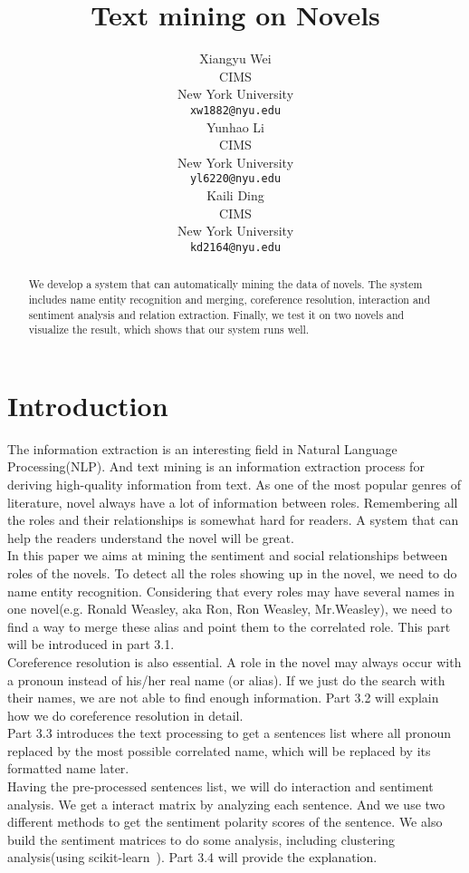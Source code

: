 \documentclass[11pt]{article}
\title{Text mining on Novels}
\author{Xiangyu Wei \\
  CIMS \\
  New York University \\
  {\tt xw1882@nyu.edu} \\\And
  Yunhao Li \\ 
  CIMS \\
  New York University \\
  {\tt yl6220@nyu.edu} \\\And
  Kaili Ding \\ 
  CIMS \\
  New York University \\
  {\tt kd2164@nyu.edu} \\}
\begin{document}
\maketitle
\begin{abstract} %
  We develop a system that can automatically mining the data of novels. The system includes name entity recognition and merging, coreference resolution, interaction and sentiment analysis and relation extraction. Finally, we test it on two novels and visualize the result, which shows that our system runs well.
\end{abstract}

\section{Introduction} %

The information extraction is an interesting field in Natural Language Processing(NLP). And text mining is an information extraction process for deriving high-quality information from text. As one of the most popular genres of literature, novel always have a lot of information between roles. Remembering all the roles and their relationships is somewhat hard for readers. A system that can help the readers understand the novel will be great. \\

In this paper we aims at mining the sentiment and social relationships between roles of the novels. To detect all the roles showing up in the novel, we need to do name entity recognition. Considering that every roles may have several names in one novel(e.g. Ronald Weasley, aka Ron, Ron Weasley, Mr.Weasley), we need to find a way to merge these alias and point them to the correlated role. This part will be introduced in part 3.1. \\

Coreference resolution is also essential. A role in the novel may always occur with a pronoun instead of his/her real name (or alias). If we just do the search with their names, we are not able to find enough information. Part 3.2 will explain how we do coreference resolution in detail.  \\

Part 3.3 introduces the text processing to get a sentences list where all pronoun replaced by the most possible correlated name, which will be replaced by its formatted name later.  \\

Having the pre-processed sentences list, we will do interaction and sentiment analysis. We get a interact matrix by analyzing each sentence. And we use two different methods to get the sentiment polarity scores of the sentence. We also build the sentiment matrices to do some analysis, including clustering analysis(using scikit-learn~\cite{sklearn_api}). Part 3.4 will provide the explanation. \\
\end{document}
